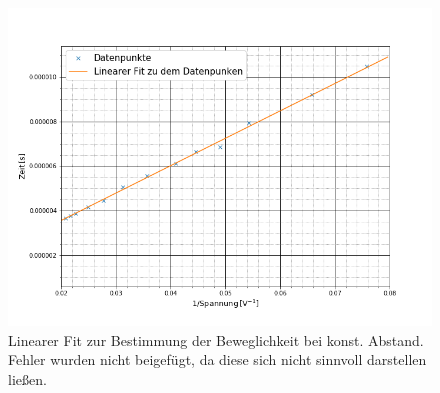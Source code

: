 	\begin{figure}[ht]
		\includegraphics[scale=0.5]{Bild/V2Abstand2}
		\centering
		\caption[Linearer Fit zur Bestimmung der Beweglichkeit bei konst. Abstand]{Linearer Fit zur Bestimmung der Beweglichkeit bei konst. Abstand. Fehler wurden nicht beigefügt, da diese sich nicht sinnvoll darstellen ließen.}
		\label{SpannungBew}
	\end{figure}
	\FloatBarrier
	\newpage
